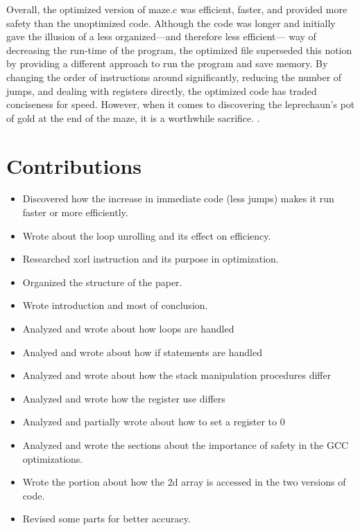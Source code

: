 \documentclass[12pt,letterpaper]{article}
\begin{document}
Overall, the optimized version of maze.c was efficient, faster, and provided 
more safety than the unoptimized code. Although the code was longer and 
initially gave the illusion of a less organized---and therefore less efficient---
way of decreasing the run-time of the program, the optimized file superseded 
this notion by providing a different approach to run the program and save memory.
By changing the order of instructions around significantly, reducing the number of 
jumps, and dealing with registers directly, the optimized code has traded conciseness 
for speed. However, when it comes to discovering the leprechaun's pot of gold at 
the end of the maze, it is a worthwhile sacrifice. 
\newpage
\appendix .
\appendixpage
\section{Contributions}
\begin{itemize}
\item Discovered how the increase in immediate code (less jumps) makes it
      run faster or more efficiently.
\item Wrote about the loop unrolling and its effect on efficiency.
\item Researched xorl instruction and its purpose in optimization.
\item Organized the structure of the paper.
\item Wrote introduction and most of conclusion.
\end{itemize}

\begin{itemize}
\item Analyzed and wrote about how loops are handled
\item Analyed and wrote about how if statements are handled
\item Analyzed and wrote about how the stack manipulation procedures differ
\item Analyzed and wrote how the register use differs
\item Analyzed and partially wrote about how to set a register to 0 
\end{itemize}

\begin{itemize}
\item Analyzed and wrote the sections about the importance of safety in the GCC
      optimizations.
\item Wrote the portion about how the 2d array is accessed in the two versions
      of code.
\item Revised some parts for better accuracy.
\end{itemize}
\end{document}
